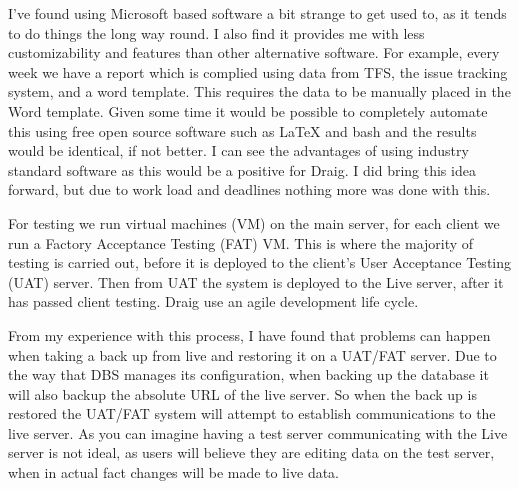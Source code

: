 \documentclass[paper=a4, fontsize=11pt]{scrartcl}	%
\begin{document}
I've found using Microsoft based software a bit strange to get used to, as it tends to do things the long way round. I also find it provides me with less customizability and features than other alternative software. For example, every week we have a report which is complied using data from TFS, the issue tracking system, and a word template. This requires the data to be manually placed in the Word template. Given some time it would be possible to completely automate this using free open source software such as LaTeX and bash and the results would be identical, if not better. I can see the advantages of using industry standard software as this would be a positive for Draig. I did bring this idea forward, but due to work load and deadlines nothing more was done with this.

For testing we run virtual machines (VM) on the main server, for each client we run a Factory Acceptance Testing (FAT) VM. This is where the majority of testing is carried out, before it is deployed to the client's User Acceptance Testing (UAT) server. Then from UAT the system is deployed to the Live server, after it has passed client testing. Draig use an agile development life cycle. 

From my experience with this process, I have found that problems can happen when taking a back up from live and restoring it on a UAT/FAT server. Due to the way that DBS manages its configuration, when backing up the database it will also backup the absolute URL of the live server. So when the back up is restored the UAT/FAT system will attempt to establish communications to the live server. As you can imagine having a test server communicating with the Live server is not ideal, as users will believe they are editing data on the test server, when in actual fact changes will be made to live data.
\end{document}
